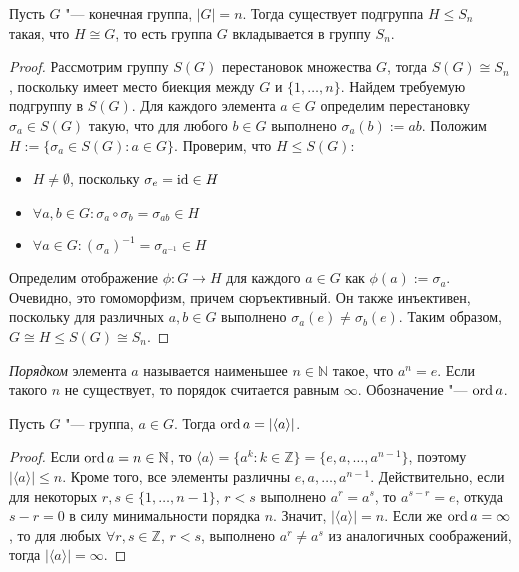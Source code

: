     \begin{theorem}[Кэли]
    	Пусть $G$ "--- конечная группа, $|G| = n$. Тогда существует подгруппа $H \le S_n$ такая, что $H \cong G$, то есть группа $G$ вкладывается в группу $S_n$.
    \end{theorem}
    
    \begin{proof}
    	Рассмотрим группу $S(G)$ перестановок множества $G$, тогда $S(G) \cong S_n$, поскольку имеет место биекция между $G$ и $\{1, \dots, n\}$. Найдем требуемую подгруппу в $S(G)$. Для каждого элемента $a \in G$ определим перестановку $\sigma_a \in S(G)$ такую, что для любого $b \in G$ выполнено $\sigma_a(b) := ab$. Положим $H := \{\sigma_a \in S(G): a \in G\}$. Проверим, что $H \le S(G)$:
    	\begin{itemize}
    		\item $H \ne \emptyset$, поскольку $\sigma_e = \mathrm{id} \in H$
    		\item $\forall a, b \in G: \sigma_a \circ \sigma_b = \sigma_{ab} \in H$
    		\item $\forall a \in G: (\sigma_a)^{-1} = \sigma_{a^{-1}} \in H$
    	\end{itemize}
    	
    	Определим отображение $\phi: G \rightarrow H$ для каждого $a \in G$ как $\phi(a) := \sigma_a$. Очевидно, это гомоморфизм, причем сюръективный. Он также инъективен, поскольку для различных $a, b \in G$ выполнено $\sigma_a(e) \ne \sigma_b(e)$. Таким образом, $G \cong H \le S(G) \cong S_n$.
    \end{proof}
    
    \begin{definition}
    	\textit{Порядком} элемента $a$ называется наименьшее $n \in \mathbb{N}$ такое, что $a^n = e$. Если такого $n$ не существует, то порядок считается равным $\infty$. Обозначение "--- $\operatorname{ord}{a}$.
    \end{definition}

    \begin{proposition}
    	Пусть $G$ "--- группа, $a \in G$. Тогда $\operatorname{ord}{a} = |\langle a\rangle|$.
    \end{proposition}
    
    \begin{proof}
    	Если $\operatorname{ord}{a} = n \in \mathbb{N}$, то $\langle a\rangle = \{a^k: k \in \mathbb{Z}\} = \{e, a, \dots, a^{n-1}\}$, поэтому $|\langle a\rangle| \le n$. Кроме того, все элементы различны $e, a, \dots, a^{n-1}$. Действительно, если для некоторых $r, s \in \{1, \dots, n-1\}$, $r < s$ выполнено $a^r = a^s$, то $a^{s - r} = e$, откуда $s - r = 0$ в силу минимальности порядка $n$. Значит, $|\langle a\rangle| = n$. Если же $\operatorname{ord}{a} = \infty$, то для любых $\forall r, s \in \mathbb{Z}$, $r < s$, выполнено $a^r \ne a^s$ из аналогичных соображений, тогда $|\langle a\rangle| = \infty$.
    \end{proof}
    
